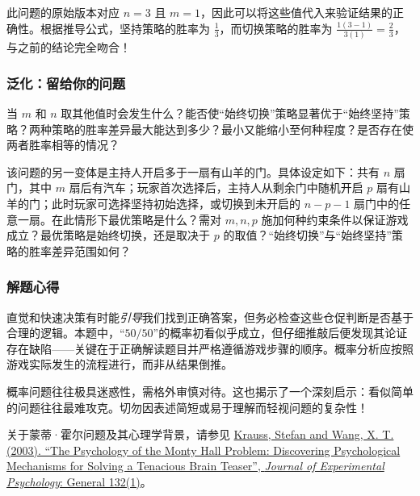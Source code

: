 此问题的原始版本对应 $n = 3$ 且 $m = 1$，因此可以将这些值代入来验证结果的正确性。根据推导公式，坚持策略的胜率为 $\frac{1}{3}$，而切换策略的胜率为 $\frac{1(3-1)}{3(1)} = \frac{2}{3}$，与之前的结论完全吻合！

\subsubsection*{泛化：留给你的问题}

当 $m$ 和 $n$ 取其他值时会发生什么？能否使``始终切换''策略显著优于``始终坚持''策略？两种策略的胜率差异最大能达到多少？最小又能缩小至何种程度？是否存在使两者胜率相等的情况？

该问题的另一变体是主持人开启多于一扇有山羊的门。具体设定如下：共有 $n$ 扇门，其中 $m$ 扇后有汽车；玩家首次选择后，主持人从剩余门中随机开启 $p$ 扇有山羊的门；此时玩家可选择坚持初始选择，或切换到未开启的 $n-p-1$ 扇门中的任意一扇。在此情形下最优策略是什么？需对 $m,n,p$ 施加何种约束条件以保证游戏成立？最优策略是始终切换，还是取决于 $p$ 的取值？``始终切换''与``始终坚持''策略的胜率差异范围如何？

\subsubsection*{解题心得}

直觉和快速决策有时能\emph{引导}我们找到正确答案，但务必检查这些仓促判断是否基于合理的逻辑。本题中，``$50/50$''的概率初看似乎成立，但仔细推敲后便发现其论证存在缺陷——关键在于正确解读题目并严格遵循游戏步骤的顺序。概率分析应按照游戏实际发生的流程进行，而非从结果倒推。

概率问题往往极具迷惑性，需格外审慎对待。这也揭示了一个深刻启示：看似简单的问题往往最难攻克。切勿因表述简短或易于理解而轻视问题的复杂性！

关于蒙蒂·霍尔问题及其心理学背景，请参见 \href{http://www.usd.edu/~xtwang/Papers/MontyHallPaper.pdf}{Krauss, Stefan and Wang, X. T. (2003). ``The Psychology of the Monty Hall Problem: Discovering Psychological Mechanisms for Solving a Tenacious Brain Teaser'', \emph{Journal of Experimental Psychology}: General 132(1)}。